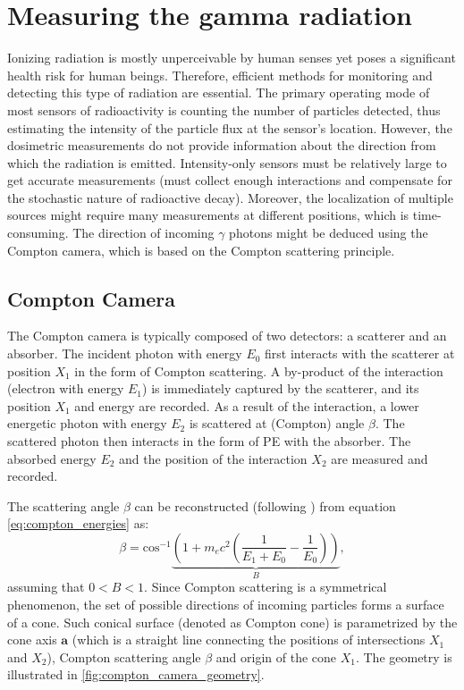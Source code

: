 \section{Measuring the gamma radiation}
Ionizing radiation is mostly unperceivable by human senses yet poses a significant health risk for human beings. 
Therefore, efficient methods for monitoring and detecting this type of radiation are essential. 
The primary operating mode of most sensors of radioactivity is counting the number of particles detected,
thus estimating the intensity of the particle flux at the sensor's location. 
However, the dosimetric measurements do not provide information about the direction from which the radiation is emitted. 
Intensity-only sensors must be relatively large to get accurate measurements (must collect enough interactions and compensate for the stochastic nature of radioactive decay).
Moreover, the localization of multiple sources might require many measurements at different positions, which is time-consuming. 
The direction of incoming $\gamma$ photons might be deduced using
the Compton camera, which is based on the Compton scattering principle.

\subsection{Compton Camera}%
The Compton camera is typically composed of two detectors: a scatterer and an absorber.
The incident photon with energy $E_{0}$ first interacts with the scatterer at position $X_{1}$ in the form of Compton scattering.
A by-product of the interaction (electron with energy $E_{1}$) is immediately captured by the scatterer, and its position $X_{1}$ and energy are recorded.
As a result of the interaction, a lower energetic photon with energy $E_{2}$ is scattered at (Compton) angle $\beta$.
The scattered photon then interacts in the form of \ac{PE} with the absorber.
The absorbed energy $E_{2}$ and the position of the interaction $X_{2}$ are measured and recorded.

The scattering angle $\beta$ can be reconstructed (following \cite{baca2021gamma}) from equation \autoref{eq:compton_energies} as:
\begin{equation}
  \beta = \mathrm{cos}^{-1} 
  \underset{B}{\underbrace{\left (
   1+m_{e}c^{2} \left( \frac{1}{E_{1}+E_{0}} - \frac{1}{E_{0}}\right )  \right )
  }},
    \label{eq:compton_beta_formula}
\end{equation}
assuming that $0<B<1$.
Since Compton scattering is a symmetrical phenomenon,  the set of possible directions of incoming particles forms a surface of a cone.
Such conical surface (denoted as Compton cone) is parametrized by the cone axis $\mathbf{a}$ (which is a straight line connecting the positions of intersections $X_{1}$ and $X_{2}$), Compton scattering angle $\beta$ and origin of the cone $X_{1}$.
The geometry is illustrated in \autoref{fig:compton_camera_geometry}.

